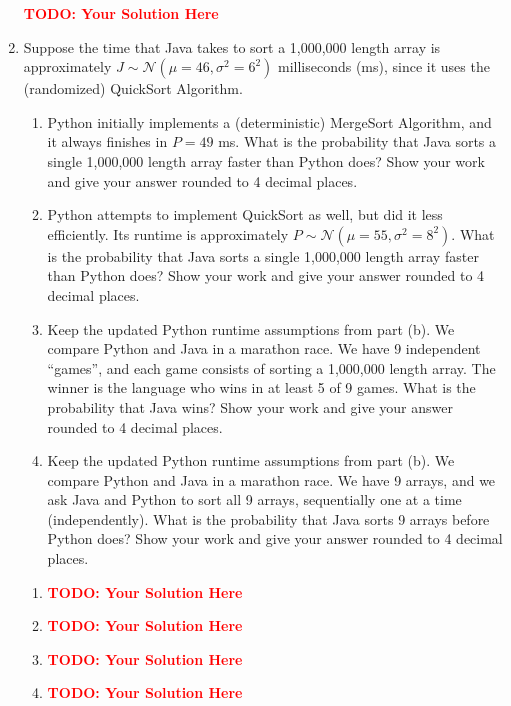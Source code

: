 \documentclass[12pt]{article}
\def\todo#1{\textcolor{red}{\textbf{#1}}}
\renewcommand{\|}{\mid}
\begin{document}
\begin{enumerate}
\begin{tcolorbox}
\todo{TODO: Your Solution Here}
\end{tcolorbox} 

\item Suppose the time that Java takes to sort a 1,000,000 length array is approximately $J\sim\mathcal{N}(\mu=46, \sigma^2=6^2)$ milliseconds (ms), since it uses the (randomized) QuickSort Algorithm. 
\begin{enumerate}
    \item Python initially implements a (deterministic) MergeSort Algorithm, and it always finishes in $P=49$ ms. What is the probability that Java sorts a single 1,000,000 length array faster than Python does? Show your work and give your answer rounded to 4 decimal places.
    \item Python attempts to implement QuickSort as well, but did it less efficiently. Its runtime is approximately $P\sim\mathcal{N}(\mu=55,\sigma^2=8^2)$. What is the probability that Java sorts a single 1,000,000 length array faster than Python does? Show your work and give your answer rounded to 4 decimal places.
    \item Keep the updated Python runtime assumptions from part (b). We compare Python and Java in a marathon race. We have 9 independent ``games'', and each game consists of sorting a 1,000,000 length array. The winner is the language who wins in at least 5 of 9 games. What is the probability that Java wins? Show your work and give your answer rounded to 4 decimal places.
    \item Keep the updated Python runtime assumptions from part (b). We compare Python and Java in a marathon race. We have 9 arrays, and we ask Java and Python to sort all 9 arrays, sequentially one at a time (independently). What is the probability that Java sorts 9 arrays before Python does? Show your work and give your answer rounded to 4 decimal places.
\end{enumerate}

\begin{tcolorbox}
\begin{enumerate}
\item \todo{TODO: Your Solution Here}
\item \todo{TODO: Your Solution Here}
\item \todo{TODO: Your Solution Here}
\item \todo{TODO: Your Solution Here}
\end{enumerate}
\end{tcolorbox}


\end{enumerate}
\end{document}
